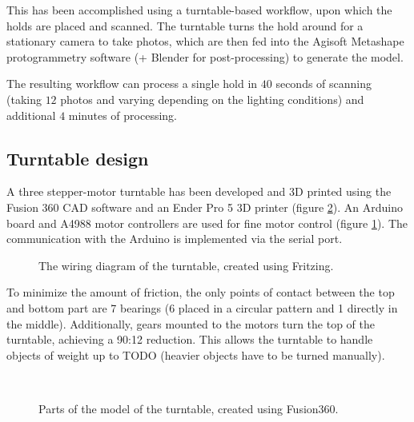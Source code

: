 This has been accomplished using a turntable-based workflow, upon which the holds are placed and scanned.
The turntable turns the hold around for a stationary camera to take photos, which are then fed into the Agisoft Metashape protogrammetry software (+ Blender for post-processing) to generate the model.

The resulting workflow can process a single hold in $40$ seconds of scanning (taking $12$ photos and varying depending on the lighting conditions) and additional $4$ minutes of processing.

\subsection{Turntable design}
A three stepper-motor turntable has been developed and 3D printed using the Fusion 360 CAD software and an Ender Pro 5 3D printer (figure \ref{fig:turntable}).
An Arduino board and A4988 motor controllers are used for fine motor control (figure \ref{fig:wiring}).
The communication with the Arduino is implemented via the serial port.

\begin{figure}
	\centering
	
	\caption{The wiring diagram of the turntable, created using Fritzing.}
	\label{fig:wiring}
\end{figure}

To minimize the amount of friction, the only points of contact between the top and bottom part are 7 bearings (6 placed in a circular pattern and 1 directly in the middle).
Additionally, gears mounted to the motors turn the top of the turntable, achieving a 90:12 reduction.
This allows the turntable to handle objects of weight up to TODO (heavier objects have to be turned manually).

\begin{figure}
	\centering
	\hfill
	\hfill
	\\
	\qquad
	\qquad
	\hfill
	\hfill
	\qquad
	\qquad
	\quad
	\qquad
	\caption{Parts of the model of the turntable, created using Fusion360.}%
	\label{fig:turntable}
\end{figure}

